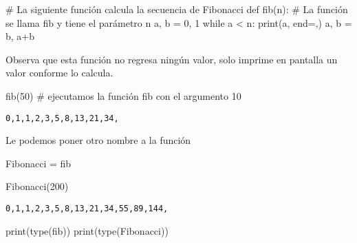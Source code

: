 \documentclass[
  letterpaper,
  DIV=11,
  numbers=noendperiod]{scrreprt}
\newenvironment{Shaded}{\begin{snugshade}}{\end{snugshade}}
\newcommand{\BuiltInTok}[1]{\textcolor[rgb]{0.00,0.23,0.31}{#1}}
\newcommand{\CommentTok}[1]{\textcolor[rgb]{0.37,0.37,0.37}{#1}}
\newcommand{\ControlFlowTok}[1]{\textcolor[rgb]{0.00,0.23,0.31}{#1}}
\newcommand{\DecValTok}[1]{\textcolor[rgb]{0.68,0.00,0.00}{#1}}
\newcommand{\KeywordTok}[1]{\textcolor[rgb]{0.00,0.23,0.31}{#1}}
\newcommand{\NormalTok}[1]{\textcolor[rgb]{0.00,0.23,0.31}{#1}}
\newcommand{\OperatorTok}[1]{\textcolor[rgb]{0.37,0.37,0.37}{#1}}
\newcommand{\StringTok}[1]{\textcolor[rgb]{0.13,0.47,0.30}{#1}}
\begin{document}
\begin{Shaded}
\begin{Highlighting}[]
\CommentTok{\# La siguiente función calcula la secuencia de Fibonacci}
\KeywordTok{def}\NormalTok{ fib(n):  }\CommentTok{\# La función se llama fib y tiene el parámetro n}
\NormalTok{    a, b }\OperatorTok{=} \DecValTok{0}\NormalTok{, }\DecValTok{1}
    \ControlFlowTok{while}\NormalTok{ a }\OperatorTok{\textless{}}\NormalTok{ n:}
        \BuiltInTok{print}\NormalTok{(a, end}\OperatorTok{=}\StringTok{\textquotesingle{},\textquotesingle{}}\NormalTok{)}
\NormalTok{        a, b }\OperatorTok{=}\NormalTok{ b, a}\OperatorTok{+}\NormalTok{b}
\end{Highlighting}
\end{Shaded}

Observa que esta función no regresa ningún valor, solo imprime en
pantalla un valor conforme lo calcula.

\begin{Shaded}
\begin{Highlighting}[]
\NormalTok{fib(}\DecValTok{50}\NormalTok{) }\CommentTok{\# ejecutamos la función fib con el argumento 10}
\end{Highlighting}
\end{Shaded}

\begin{verbatim}
0,1,1,2,3,5,8,13,21,34,
\end{verbatim}

Le podemos poner otro nombre a la función

\begin{Shaded}
\begin{Highlighting}[]
\NormalTok{Fibonacci }\OperatorTok{=}\NormalTok{ fib}
\end{Highlighting}
\end{Shaded}

\begin{Shaded}
\begin{Highlighting}[]
\NormalTok{Fibonacci(}\DecValTok{200}\NormalTok{)}
\end{Highlighting}
\end{Shaded}

\begin{verbatim}
0,1,1,2,3,5,8,13,21,34,55,89,144,
\end{verbatim}

\begin{Shaded}
\begin{Highlighting}[]
\BuiltInTok{print}\NormalTok{(}\BuiltInTok{type}\NormalTok{(fib))}
\BuiltInTok{print}\NormalTok{(}\BuiltInTok{type}\NormalTok{(Fibonacci))}
\end{Highlighting}
\end{Shaded}
\end{document}
